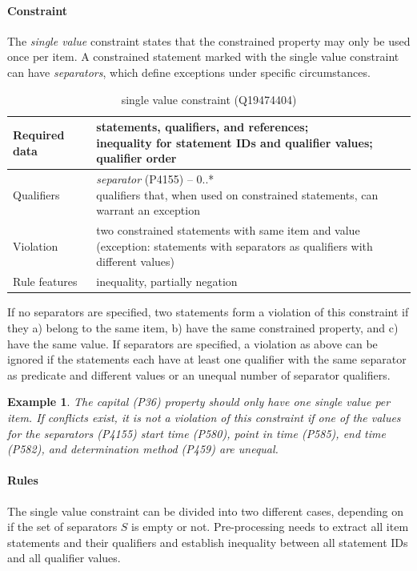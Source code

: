 \documentclass[hyperref,bachelorofscience,fleqn]{cgvpub}
\newtheorem{example}{Example}
\begin{document}
\paragraph{Constraint}
The \emph{single value} constraint states that the constrained property may only be used once per item. A constrained statement marked with the single value constraint can have \emph{separators}, which define exceptions under specific circumstances.
\begin{table}[H]
\caption{single value constraint (Q19474404)}
\begin{tabularx}{\textwidth}{ ll X}
\hline
Required data & \makecell{statements, qualifiers, and references; \\
inequality for statement IDs and qualifier values; \\
qualifier order} \\
\hline
Qualifiers & \makecell{\emph{separator} (P4155) -- 0..* \\ qualifiers that, when used on constrained statements, can warrant an exception} \\
\hline
Violation & \makecell{two constrained statements with same item and value \\ (exception: statements with separators as qualifiers with different values)} \\
\hline
Rule features & inequality, partially negation \\
\hline
\end{tabularx}
\end{table}

If no separators are specified, two statements form a violation of this constraint if they a) belong to the same item, b) have the same constrained property, and c) have the same value.
If separators are specified, a violation as above can be ignored if the statements each have at least one qualifier with the same separator as predicate and different values or an unequal number of separator qualifiers.

\begin{example}
The \emph{capital} (P36) property should only have one single value per item. If conflicts exist, it is not a violation of this constraint if one of the values for the \emph{separators} (P4155) \emph{start time} (P580), \emph{point in time} (P585), \emph{end time} (P582), and \emph{determination method} (P459) are unequal.
\end{example}

\paragraph{Rules}
The single value constraint can be divided into two different cases, depending on if the set of separators \(S\) is empty or not. Pre-processing needs to extract all item statements and their qualifiers and establish inequality between all statement IDs and all qualifier values.
\end{document}
